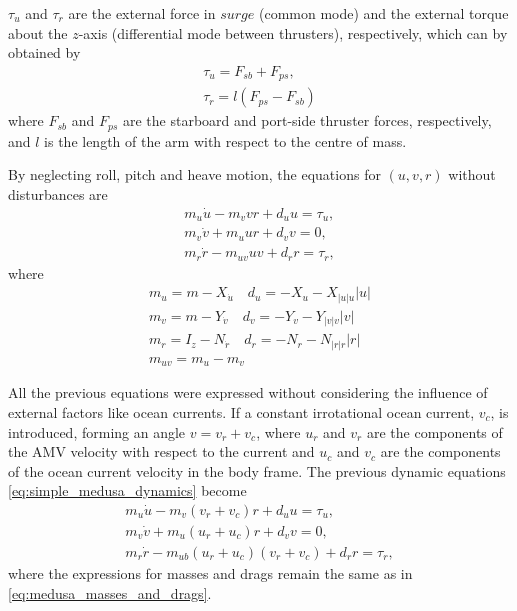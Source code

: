 \par $\tau_u$ and $\tau_r$ are the external force in $surge$ (common mode) and the external torque about the $z$-axis (differential mode between thrusters), respectively, which can by obtained by 
\begin{equation}
    \begin{gathered}
        \tau_u = F_{sb} + F_{ps}, \\
        \tau_r = l(F_{ps} - F_{sb})
    \end{gathered}
    \label{eq:simple_medusa_kinematics}
\end{equation}
where $F_{sb}$ and $F_{ps}$ are the starboard and port-side thruster forces, respectively, and $l$ is the length of the arm with respect to the centre of mass.
\par By neglecting roll, pitch and heave motion, the equations for $(u,v,r)$ without disturbances are
\begin{equation} 
    \begin{gathered}
        m_u\dot{u} - m_v v r + d_u u = \tau_u, \\
        m_v \dot{v} + m_u u r + d_v v = 0, \\
        m_r \dot{r} - m_{uv} u v + d_r r = \tau_r,
    \end{gathered}
    \label{eq:simple_medusa_dynamics}
\end{equation}
where
\begin{equation}
    \begin{gathered}
        m_u = m - X_{\dot{u}} \quad d_u = - X_u - X_{|u|u} |u| \\
        m_v = m - Y_{\dot{v}} \quad d_v = - Y_v - Y_{|v|v}|v| \\
        m_r = I_z - N_{\dot{r}} \quad d_r = - N_r - N_{|r|r}|r| \\
        m_{uv} = m_u - m_v
    \end{gathered}
    \label{eq:medusa_masses_and_drags}
\end{equation}


\par All the previous equations were expressed without considering the influence of external factors like ocean currents. If a constant irrotational ocean current, $v_c$, is introduced, forming an angle $v = v_r+v_c$, where $u_r$ and $v_r$ are the components of the \acs{AMV} velocity with respect to the current and $u_c$ and $v_c$ are the components of the ocean current velocity in the body frame.
The previous dynamic equations \eqref{eq:simple_medusa_dynamics} become
\begin{equation}
    \begin{gathered}
        m_u\dot{u}-m_v(v_r+v_c)r+d_u u=\tau_u, \\
        m_v\dot{v}+m_u(u_r+u_c) r + d_v v=0, \\
        m_r\dot{r}-m_{ub}(u_r+u_c)(v_r+v_c)+d_r r=\tau_r,
    \end{gathered}
\end{equation}
where the expressions for masses and drags remain the same as in \eqref{eq:medusa_masses_and_drags}.

